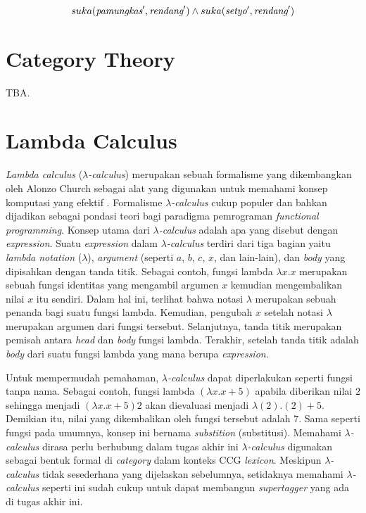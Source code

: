 \begin{equation}\label{ccg:query:1}
  suka(\mbox{\it pamungkas}^\prime, \mbox{\it rendang}^\prime) \land suka(\mbox{\it setyo}^\prime, \mbox{\it rendang}^\prime)
\end{equation}

\section{Category Theory}
TBA.


\section{Lambda Calculus}
\textit{Lambda calculus} ({$\lambda$}\textit{-calculus}) merupakan sebuah formalisme yang dikembangkan
oleh Alonzo Church sebagai alat yang digunakan untuk memahami konsep komputasi yang efektif
\cite{DBLP:journals/corr/Rojas15}.
Formalisme {$\lambda$}\textit{-calculus} cukup populer dan bahkan dijadikan sebagai pondasi teori bagi
paradigma pemrograman \textit{functional programming}.
Konsep utama dari {$\lambda$}\textit{-calculus} adalah apa yang disebut dengan \textit{expression}.
Suatu \textit{expression} dalam {$\lambda$}\textit{-calculus} terdiri dari tiga bagian yaitu
\textit{lambda notation} ({$\lambda$}), \textit{argument} (seperti $a$, $b$, $c$, $x$, dan lain-lain),
dan \textit{body} yang dipisahkan dengan tanda titik.
Sebagai contoh, fungsi lambda ${\lambda}x. x$ merupakan sebuah fungsi identitas yang mengambil
argumen $x$ kemudian mengembalikan nilai $x$ itu sendiri.
Dalam hal ini, terlihat bahwa notasi {$\lambda$} merupakan sebuah penanda bagi suatu fungsi lambda.
Kemudian, pengubah $x$ setelah notasi {$\lambda$} merupakan argumen dari fungsi tersebut.
Selanjutnya, tanda titik merupakan pemisah antara \textit{head} dan \textit{body} fungsi lambda.
Terakhir, setelah tanda titik adalah \textit{body} dari suatu fungsi lambda yang mana berupa
\textit{expression}.

Untuk mempermudah pemahaman, {$\lambda$}\textit{-calculus} dapat diperlakukan seperti fungsi tanpa
nama. Sebagai contoh, fungsi lambda $({\lambda}x. x + 5)$ apabila diberikan nilai $2$ sehingga
menjadi $({\lambda}x. x + 5) 2$ akan dievaluasi menjadi ${\lambda}(2). (2) + 5$.
Demikian itu, nilai yang dikembalikan oleh fungsi tersebut adalah $7$.
Sama seperti fungsi pada umumnya, konsep ini bernama \textit{substition} (substitusi).
Memahami {$\lambda$}\textit{-calculus} dirasa perlu berhubung dalam tugas akhir ini
{$\lambda$}\textit{-calculus} digunakan sebagai bentuk formal di \textit{category}
dalam konteks CCG \textit{lexicon}. Meskipun {$\lambda$}\textit{-calculus} tidak sesederhana
yang dijelaskan sebelumnya, setidaknya memahami {$\lambda$}\textit{-calculus} seperti ini
sudah cukup untuk dapat membangun \textit{supertagger} yang ada di tugas akhir ini.


